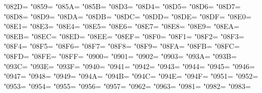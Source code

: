 \XeTeXcharclass"082D=\KclassCM
\XeTeXcharclass"0859=\KclassCM
\XeTeXcharclass"085A=\KclassCM
\XeTeXcharclass"085B=\KclassCM
\XeTeXcharclass"08D3=\KclassCM
\XeTeXcharclass"08D4=\KclassCM
\XeTeXcharclass"08D5=\KclassCM
\XeTeXcharclass"08D6=\KclassCM
\XeTeXcharclass"08D7=\KclassCM
\XeTeXcharclass"08D8=\KclassCM
\XeTeXcharclass"08D9=\KclassCM
\XeTeXcharclass"08DA=\KclassCM
\XeTeXcharclass"08DB=\KclassCM
\XeTeXcharclass"08DC=\KclassCM
\XeTeXcharclass"08DD=\KclassCM
\XeTeXcharclass"08DE=\KclassCM
\XeTeXcharclass"08DF=\KclassCM
\XeTeXcharclass"08E0=\KclassCM
\XeTeXcharclass"08E1=\KclassCM
\XeTeXcharclass"08E3=\KclassCM
\XeTeXcharclass"08E4=\KclassCM
\XeTeXcharclass"08E5=\KclassCM
\XeTeXcharclass"08E6=\KclassCM
\XeTeXcharclass"08E7=\KclassCM
\XeTeXcharclass"08E8=\KclassCM
\XeTeXcharclass"08E9=\KclassCM
\XeTeXcharclass"08EA=\KclassCM
\XeTeXcharclass"08EB=\KclassCM
\XeTeXcharclass"08EC=\KclassCM
\XeTeXcharclass"08ED=\KclassCM
\XeTeXcharclass"08EE=\KclassCM
\XeTeXcharclass"08EF=\KclassCM
\XeTeXcharclass"08F0=\KclassCM
\XeTeXcharclass"08F1=\KclassCM
\XeTeXcharclass"08F2=\KclassCM
\XeTeXcharclass"08F3=\KclassCM
\XeTeXcharclass"08F4=\KclassCM
\XeTeXcharclass"08F5=\KclassCM
\XeTeXcharclass"08F6=\KclassCM
\XeTeXcharclass"08F7=\KclassCM
\XeTeXcharclass"08F8=\KclassCM
\XeTeXcharclass"08F9=\KclassCM
\XeTeXcharclass"08FA=\KclassCM
\XeTeXcharclass"08FB=\KclassCM
\XeTeXcharclass"08FC=\KclassCM
\XeTeXcharclass"08FD=\KclassCM
\XeTeXcharclass"08FE=\KclassCM
\XeTeXcharclass"08FF=\KclassCM
\XeTeXcharclass"0900=\KclassCM
\XeTeXcharclass"0901=\KclassCM
\XeTeXcharclass"0902=\KclassCM
\XeTeXcharclass"0903=\KclassCM
\XeTeXcharclass"093A=\KclassCM
\XeTeXcharclass"093B=\KclassCM
\XeTeXcharclass"093C=\KclassCM
\XeTeXcharclass"093E=\KclassCM
\XeTeXcharclass"093F=\KclassCM
\XeTeXcharclass"0940=\KclassCM
\XeTeXcharclass"0941=\KclassCM
\XeTeXcharclass"0942=\KclassCM
\XeTeXcharclass"0943=\KclassCM
\XeTeXcharclass"0944=\KclassCM
\XeTeXcharclass"0945=\KclassCM
\XeTeXcharclass"0946=\KclassCM
\XeTeXcharclass"0947=\KclassCM
\XeTeXcharclass"0948=\KclassCM
\XeTeXcharclass"0949=\KclassCM
\XeTeXcharclass"094A=\KclassCM
\XeTeXcharclass"094B=\KclassCM
\XeTeXcharclass"094C=\KclassCM
\XeTeXcharclass"094E=\KclassCM
\XeTeXcharclass"094F=\KclassCM
\XeTeXcharclass"0951=\KclassCM
\XeTeXcharclass"0952=\KclassCM
\XeTeXcharclass"0953=\KclassCM
\XeTeXcharclass"0954=\KclassCM
\XeTeXcharclass"0955=\KclassCM
\XeTeXcharclass"0956=\KclassCM
\XeTeXcharclass"0957=\KclassCM
\XeTeXcharclass"0962=\KclassCM
\XeTeXcharclass"0963=\KclassCM
\XeTeXcharclass"0981=\KclassCM
\XeTeXcharclass"0982=\KclassCM
\XeTeXcharclass"0983=\KclassCM
